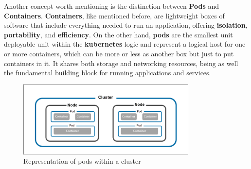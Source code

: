 Another concept worth mentioning is the distinction between \textbf{Pods} and \textbf{Containers}. \textbf{Containers}, like mentioned before, are lightweight boxes of software that include everything needed to run an application, offering \textbf{isolation}, \textbf{portability}, and \textbf{efficiency}. On the other hand, \textbf{pods} are the smallest unit deployable unit within the \textbf{kubernetes} logic and represent a logical host for one or more containers, which can be more or less as another box but just to put containers in it. It shares both storage and networking resources, being as well the fundamental building block for running applications and services.

\begin{figure}[H]
    \centering
    \includegraphics[width=0.8\textwidth]{assets/tools/kubernetes/pods.png} %
    \caption{Representation of pods within a cluster}
    \label{fig:sample-image} 
\end{figure}

